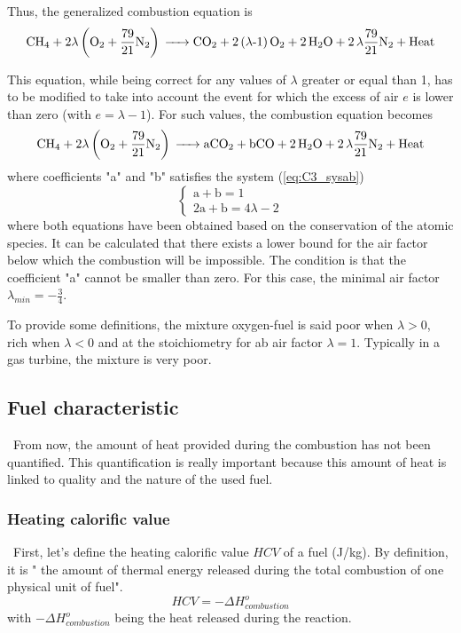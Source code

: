 Thus, the generalized combustion equation is
\begin{equation}
\ce{CH4 +}2\lambda \left(\ce{O2}+\frac{79}{21}\ce{N2}\right) \ce{-> CO2 + 2(\lambda-1)O2 + 2H2O + 2\lambda\frac{79}{21}N2 + \text{Heat}}\label{eq:C3_chemgeng0}
\end{equation}

This equation, while being correct for any values of $\lambda$ greater or equal than 1, has to be modified to take into account the event for which the excess of air $e$ is lower than zero (with $e=\lambda -1$). For such values, the combustion equation becomes 
\begin{equation}
\ce{CH4 +}2\lambda \left(\ce{O2}+\frac{79}{21}\ce{N2}\right) \ce{-> aCO2 + bCO + 2H2O + 2\lambda\frac{79}{21}N2 + \text{Heat}}\label{eq:C3_chemgeng1}
\end{equation}
where coefficients "a" and "b" satisfies the system (\ref{eq:C3_sysab})
\begin{equation}
\begin{cases}
\text{a} + \text{b} = 1\\
2\text{a} + \text{b} = 4\lambda - 2
\end{cases}\label{eq:C3_sysab}
\end{equation}
where both equations have been obtained based on the conservation of the atomic species. It can be calculated that there exists a lower bound for the air factor below which the combustion will be impossible. The condition is that the coefficient "a" cannot be smaller than zero. For this case, the minimal air factor $\lambda_{min} =-\frac{3}{4}$.

To provide some definitions, the mixture oxygen-fuel is said poor when $\lambda>0$, rich when $\lambda<0$ and at the stoichiometry for ab air factor $\lambda=1$. Typically in a gas turbine, the mixture is very poor.
\newpage
\subsection{Fuel characteristic}
\quad\, From now, the amount of heat provided during the combustion has not been quantified. This quantification is really important because this amount of heat is linked to quality and the nature of the used fuel.

\subsubsection{Heating calorific value}
\quad\, First, let's define the heating calorific value $HCV$ of a fuel (J/kg). By definition, it is " the amount of thermal energy released during the total combustion of one physical unit of fuel"\citep{Leonard2018}. 
\begin{equation}
HCV = -\Delta H^o_{combustion} \label{eq:C3_HCV1}
\end{equation}
with $-\Delta H^o_{combustion}$ being the heat released during the reaction.

